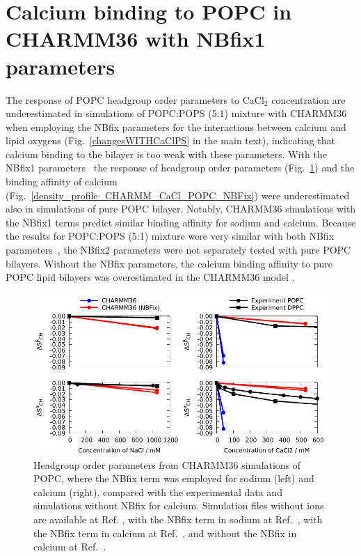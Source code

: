 \documentclass[journal=jpcbfk,manuscript=article]{achemso}
\begin{document}
\clearpage
\section{Calcium binding to POPC in CHARMM36 with NBfix1 parameters}\label{CHARMMcalciumNBfix}

The response of POPC headgroup order parameters to CaCl$_2$ concentration
are underestimated in simulations of POPC:POPS (5:1) mixture with CHARMM36 when employing the
NBfix %
parameters for the interactions between calcium and lipid oxygens \cite{kim16,han2018graph}
(Fig.~\ref{changesWITHCaClPS} in the main text), indicating that calcium binding to the
bilayer is too weak with these parameters. With the NBfix1 parameters~\cite{kim16} the response of headgroup order
parameters (Fig.~\ref{OP_CHARMM_CaCl_POPC_NBFix}) and the binding affinity
of calcium (Fig.~\ref{density_profile_CHARMM_CaCl_POPC_NBFix})
were underestimated also in simulations of pure POPC bilayer.
Notably, CHARMM36 simulations with the NBfix1 terms \cite{venable13,kim16} predict similar binding affinity for sodium and calcium.
Because the results for POPC:POPS (5:1) mixture were very similar with both NBfix parameters~\cite{kim16,han2018graph},
the NBfix2 parameters were not separately tested with pure POPC bilayers.
Without the NBfix parameters, the calcium binding affinity to pure POPC lipid bilayers was overestimated in the CHARMM36 model \cite{catte16}.

\begin{figure}[]
  \centering
  \includegraphics[width=14.5cm]{../Figs/OP_CHARMM_CaCl_POPC_NBFix.pdf}
  \caption{\label{OP_CHARMM_CaCl_POPC_NBFix}
    Headgroup order parameters from CHARMM36 simulations of POPC, where the NBfix term was employed for sodium \cite{venable13} (left)
    and calcium \cite{kim16} (right), compared with the experimental data \cite{akutsu81,altenbach84}
    and simulations without NBfix for calcium.
    Simulation files without ions are available at Ref. ,
    with the NBfix term in sodium at Ref.~, 
    with the NBfix term in calcium at Ref.~, and
    without the NBfix in calcium at Ref.~.
  }
\end{figure}
\end{document}

